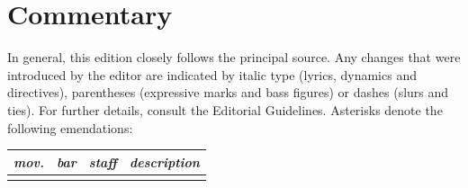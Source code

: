 \documentclass[abbrwidth=7em,shorttitlesize=55]{ees}
\begin{document}
\section{Commentary}

In general, this edition closely follows the principal source. Any changes that were introduced by the editor are indicated by italic type (lyrics, dynamics and directives), parentheses (expressive marks and bass figures) or dashes (slurs and ties). For further details, consult the Editorial Guidelines. Asterisks denote the following emendations:

\begin{xltabular}{\textwidth}{lll X}
  \toprule
  \itshape mov. & \itshape bar & \itshape staff & \itshape description \\
  \midrule \endhead
  \bottomrule \endfoot


\end{xltabular}
\end{document}
